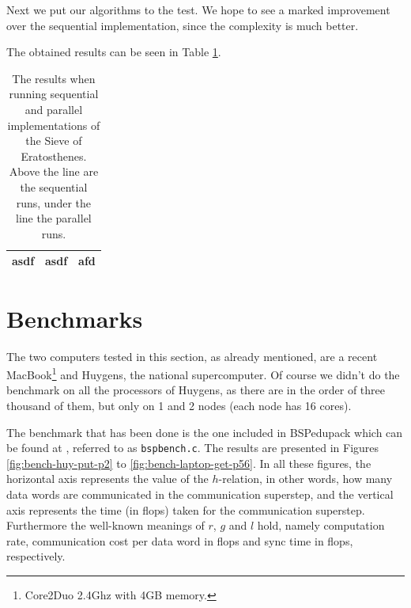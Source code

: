 \documentclass[a4paper]{article}
\begin{document}
Next we put our algorithms to the test. We hope to see a marked improvement over
the sequential implementation, since the complexity is much better. 

The obtained results can be seen in Table \ref{tbl:results}. 

\begin{table}
    \centering
    \begin{tabular}{c|c|c}
        asdf & asdf & afd \\
        \hline

    \end{tabular}
    \caption{The results when running sequential and parallel implementations of
    the Sieve of Eratosthenes. Above the line are the sequential runs, under the
    line the parallel runs.}
    \label{tbl:results}
\end{table}



\section{Benchmarks}

The two computers tested in this section, as already mentioned, are a recent
MacBook\footnote{Core2Duo 2.4Ghz with 4GB memory.} and Huygens, the national
supercomputer. Of course we didn't do the benchmark on all the processors of Huygens,
as there are in the order of three thousand of them, but only on 1 and 2 nodes
(each node has 16 cores). 

The benchmark that has been done is the one included in BSPedupack which can be
found at \cite{edupack}, referred to as \texttt{bspbench.c}. The results are
presented in Figures \ref{fig:bench-huy-put-p2} to
\ref{fig:bench-laptop-get-p56}. In all these figures, the horizontal axis
represents the value of the $h$-relation, in other words, how many data words
are communicated in the communication superstep, and the vertical axis
represents the time (in flops) taken for the communication superstep.
Furthermore the well-known meanings of $r$, $g$ and $l$ hold, namely computation
rate, communication cost per data word in flops and sync time in flops,
respectively. 
\end{document}
